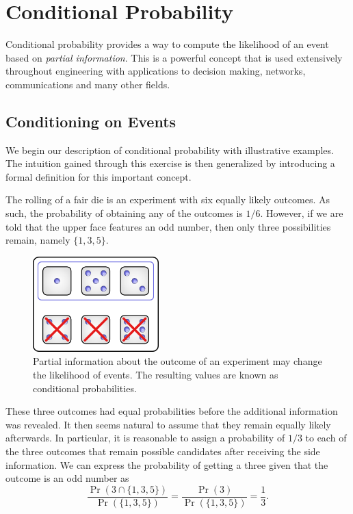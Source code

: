 \chapter{Conditional Probability}
\label{chapter:ConditionalProbability}

Conditional probability provides a way to compute the likelihood of an event based on \emph{partial information}.
This is a powerful concept that is used extensively throughout engineering with applications to decision making, networks, communications and many other fields.


\section{Conditioning on Events}

We begin our description of conditional probability with illustrative examples.
The intuition gained through this exercise is then generalized by introducing a formal definition for this important concept.

\begin{example}
The rolling of a fair die is an experiment with six equally likely outcomes.
As such, the probability of obtaining any of the outcomes is $1/6$.
However, if we are told that the upper face features an odd number, then only three possibilities remain, namely $\{1, 3, 5 \}$.
\begin{figure}[htb!]
\begin{center}
\includegraphics[height=3.675cm]{Figures/3Chapter/condevent}
\caption{Partial information about the outcome of an experiment may change the likelihood of events.
The resulting values are known as conditional probabilities.}
\label{figure:CondEvent}
\end{center}
\end{figure}
These three outcomes had equal probabilities before the additional information was revealed.
It then seems natural to assume that they remain equally likely afterwards.
In particular, it is reasonable to assign a probability of $1/3$ to each of the three outcomes that remain possible candidates after receiving the side information.
We can express the probability of getting a three given that the outcome is an odd number as
\begin{equation*}
\frac{\Pr (3 \cap \{ 1, 3, 5 \})}{\Pr (\{ 1, 3, 5 \} ) }
= \frac{\Pr(3)}{\Pr (\{1,3,5\})} = \frac{1}{3} .
\end{equation*}
\end{example}

